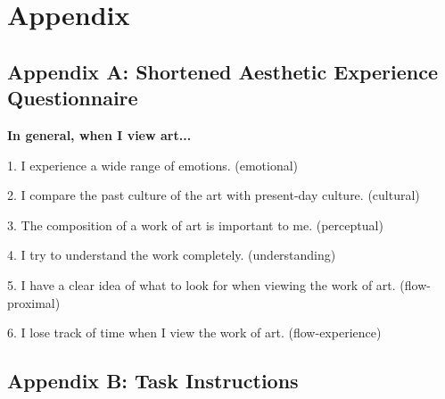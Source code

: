 \documentclass[../main.tex]{subfiles}
\begin{document}
\section{Appendix}
\subsection{Appendix A: Shortened Aesthetic Experience Questionnaire} 
	
	\textbf{In general, when I view art...}
		
	1. I experience a wide range of emotions. (emotional)
	
	2. I compare the past culture of the art with present-day culture. (cultural)
	
	3. The composition of a work of art is important to me. (perceptual)
	
	
	4. I try to understand the work completely. (understanding)
	
	
	5. I have a clear idea of what to look for when viewing the work of art. (flow-proximal)
	
	
	6. I lose track of time when I view the work of art. (flow-experience)

\newpage

\subsection{Appendix B: Task Instructions}
\end{document}
